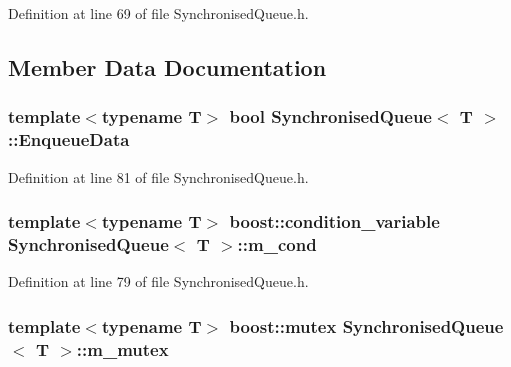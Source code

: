 \-Definition at line 69 of file \-Synchronised\-Queue.\-h.



\subsection{\-Member \-Data \-Documentation}
\hypertarget{classSynchronisedQueue_af6fe02819110807b9c562da12d19763b}{
\subsubsection[{\-Enqueue\-Data}]{\setlength{\rightskip}{0pt plus 5cm}template$<$typename \-T$>$ bool {\bf \-Synchronised\-Queue}$<$ \-T $>$\-::{\bf \-Enqueue\-Data}}}\label{classSynchronisedQueue_af6fe02819110807b9c562da12d19763b}


\-Definition at line 81 of file \-Synchronised\-Queue.\-h.

\hypertarget{classSynchronisedQueue_a9561fdd948fc105f361af18b1f58e875}{
\subsubsection[{m\-\_\-cond}]{\setlength{\rightskip}{0pt plus 5cm}template$<$typename \-T$>$ boost\-::condition\-\_\-variable {\bf \-Synchronised\-Queue}$<$ \-T $>$\-::{\bf m\-\_\-cond}}}\label{classSynchronisedQueue_a9561fdd948fc105f361af18b1f58e875}


\-Definition at line 79 of file \-Synchronised\-Queue.\-h.

\hypertarget{classSynchronisedQueue_a94b11f8a9abb258e72162cc0988458ef}{
\subsubsection[{m\-\_\-mutex}]{\setlength{\rightskip}{0pt plus 5cm}template$<$typename \-T$>$ boost\-::mutex {\bf \-Synchronised\-Queue}$<$ \-T $>$\-::{\bf m\-\_\-mutex}}}\label{classSynchronisedQueue_a94b11f8a9abb258e72162cc0988458ef}


